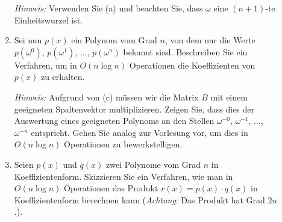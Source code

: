 \documentclass[a4paper,twoside,12pt]{article}
\begin{document}
\begin{description}
\begin{enumerate}
  \emph{Hinweis:} Verwenden Sie (a) und beachten Sie, dass $\omega$
      eine $(n+1)$-te Einheitswurzel ist.

\item Sei nun $p(x)$ ein Polynom vom Grad $n$,
  von dem nur die Werte
  $p(\omega^0)$, $p(\omega^1)$, $\ldots$, $p(\omega^{n})$
  bekannt sind.
  Beschreiben Sie ein Verfahren, um in
  $O(n \log n)$ Operationen die Koeffizienten
  von $p(x)$ zu erhalten. 

  \emph{Hinweis:} Aufgrund von (c) m\"ussen wir die Matrix $B$
     mit einem geeigneten Spaltenvektor multiplizieren. Zeigen Sie,
     dass dies der Auswertung eines geeigneten Polynoms an den Stellen
     $\omega^{-0}$, $\omega^{-1}$, $\ldots$, $\omega^{-n}$ entspricht.
     Gehen Sie analog zur Vorlesung vor, um dies in
     $O(n \log n)$ Operationen zu bewerkstelligen.

 \item 
    Seien $p(x)$ und $q(x)$ zwei Polynome vom Grad $n$
    in Koeffizientenform. 
    Skizzieren Sie ein Verfahren, wie man in $O(n\log n)$ Operationen
    das Produkt $r(x) = p(x) \cdot q(x)$
    in Koeffizientenform berechnen kann 
    (\emph{Achtung}: Das Produkt hat Grad $2n$.).
\end{enumerate}
\fi
\end{description}
\end{document}
